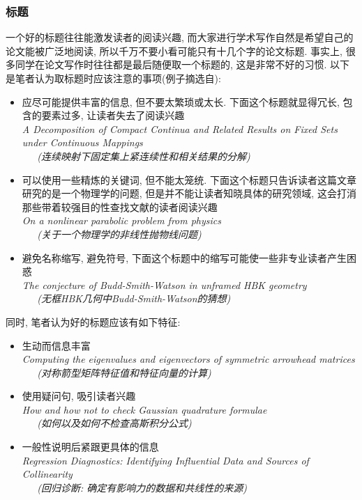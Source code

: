 \documentclass{formatBook}
\begin{document}
\subsubsection{标题}
一个好的标题往往能激发读者的阅读兴趣, 而大家进行学术写作自然是希望自己的论文能被广泛地阅读, 所以千万不要小看可能只有十几个字的论文标题. 事实上, 很多同学在论文写作时往往都是最后随便取一个标题的, 这是非常不好的习惯. 以下是笔者认为取标题时应该注意的事项(例子摘选自\cite{JungelHow}): 
\begin{itemize}
    \item 应尽可能提供丰富的信息, 但不要太繁琐或太长. 下面这个标题就显得冗长, 包含的要素过多, 让读者失去了阅读兴趣\\
          \textit{A Decomposition of Compact Continua and Related Results on Fixed Sets under Continuous Mappings \\ \ \ \  (连续映射下固定集上紧连续性和相关结果的分解)}
    \item 可以使用一些精炼的关键词, 但不能太笼统. 下面这个标题只告诉读者这篇文章研究的是一个物理学的问题, 但是并不能让读者知晓具体的研究领域, 这会打消那些带着较强目的性查找文献的读者阅读兴趣\\
          \textit{On a nonlinear parabolic problem from physics \\ \ \ \  (关于一个物理学的非线性抛物线问题)}
    \item 避免名称缩写, 避免符号, 下面这个标题中的缩写可能使一些非专业读者产生困惑\\
          \textit{The conjecture of Budd-Smith-Watson in unframed HBK geometry  \\ \ \ \ (无框HBK几何中Budd-Smith-Watson的猜想)}
\end{itemize}
\par
同时, 笔者认为好的标题应该有如下特征: 
\begin{itemize}
    \item 生动而信息丰富\\
          \textit{Computing the eigenvalues and eigenvectors of symmetric arrowhead matrices \\ \ \ \ (对称箭型矩阵特征值和特征向量的计算)}
    \item 使用疑问句, 吸引读者兴趣\\
          \textit{How and how not to check Gaussian quadrature formulae \\ \ \ \ (如何以及如何不检查高斯积分公式)}
    \item 一般性说明后紧跟更具体的信息\\
          \textit{Regression Diagnostics: Identifying Influential Data and Sources of Collinearity \\  \ \ \
              (回归诊断: 确定有影响力的数据和共线性的来源)}
\end{itemize}
\end{document}
